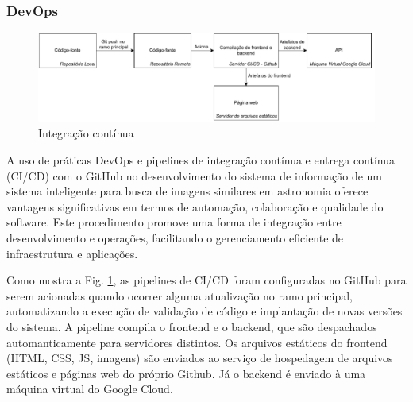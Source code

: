 

\subsubsection{DevOps}
\label{sec:si-devops}

\begin{figure}[!ht]
  \centering
  \includegraphics[width=\linewidth]{figures/ci-cd.pdf}
  \caption{Integração contínua}
  \label{fig:ci-cd}
\end{figure}

A uso de práticas DevOps e pipelines de integração contínua e entrega contínua (CI/CD) com o GitHub no desenvolvimento do sistema de informação de um sistema inteligente para busca de imagens similares em astronomia oferece vantagens significativas em termos de automação, colaboração e qualidade do software. Este procedimento promove uma forma de integração entre desenvolvimento e operações, facilitando o gerenciamento eficiente de infraestrutura e aplicações.

Como mostra a Fig. \ref{fig:ci-cd}, as pipelines de CI/CD foram configuradas no GitHub para serem acionadas quando ocorrer alguma atualização no ramo principal, automatizando a execução de validação de código e implantação de novas versões do sistema. A pipeline compila o frontend e o backend, que são despachados automanticamente para servidores distintos. Os arquivos estáticos do frontend (HTML, CSS, JS, imagens) são enviados ao serviço de hospedagem de arquivos estáticos e páginas web do próprio Github. Já o backend é enviado à uma máquina virtual do Google Cloud.

